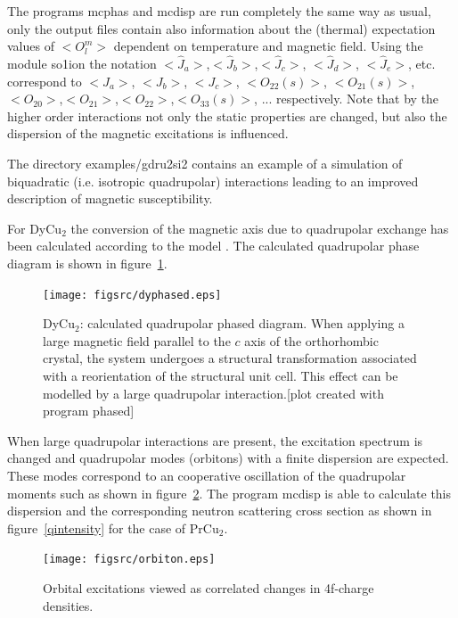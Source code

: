 The programs {\prg mcphas} and {\prg mcdisp} are run completely the same way as usual, only
the output files contain also information about the (thermal) expectation values of $<O_l^m>$
dependent on temperature and magnetic field. 
Using the module so1ion the notation $<\hat J_a>$,$<\hat J_b>$,$<\hat J_c>$,
$<\hat J_d>$, $<\hat J_e>$, etc. correspond to $<J_a>$, $<J_b>$,
$<J_c>$, $<O_{22}(s)>$, $<O_{21}(s)>$,$<O_{20}>$,$<O_{21}>$,$<O_{22}>$,$<O_{33}(s)>$, ...
 respectively.
Note that by the higher order interactions not only the static properties are changed, but also the
dispersion of the magnetic excitations is influenced.


The directory {\prg examples/gdru2si2} contains an example of a simulation of biquadratic (i.e. isotropic %
quadrupolar) interactions leading to an improved description of magnetic susceptibility.

For DyCu$_2$ the conversion
of the magnetic axis due to quadrupolar exchange has been calculated according to the model 
\cite{yoshida98-1421}. The calculated quadrupolar phase diagram is shown in figure~\ref{qphased}.

\begin{figure}[hb]%
\begin{center}\leavevmode
\texttt{[image: figsrc/dyphased.eps]}
\end{center}
\caption{DyCu$_2$: calculated quadrupolar phased diagram. When applying a large magnetic field
parallel to the $c$ axis of the orthorhombic crystal, the system undergoes a structural transformation
associated with a reorientation of the structural unit cell. This effect can be modelled by a large
quadrupolar interaction.[plot created with program {\prg phased}]}
\label{qphased}
\end{figure}

When large  quadrupolar interactions are present, the excitation spectrum is changed and
quadrupolar modes (orbitons) with a finite dispersion are expected. 
These modes correspond to an cooperative oscillation of the quadrupolar moments such as shown
in figure~\ref{qmodes}.
The program {\prg mcdisp}
is able to calculate this dispersion and the corresponding neutron scattering cross section as shown
in figure~\ref{qintensity} for the case of PrCu$_2$. 
 

\begin{figure}[hb]%
\begin{center}\leavevmode
\texttt{[image: figsrc/orbiton.eps]}
\end{center}
\caption{Orbital excitations viewed  as correlated changes in 4f-charge densities.}
\label{qmodes}
\end{figure}

